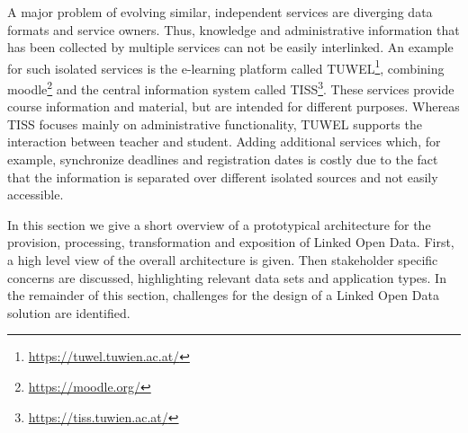\documentclass{article}
\begin{document}
A major problem of evolving similar, independent services are diverging data formats and service owners. Thus, knowledge and administrative information that has been collected by multiple services can not be easily interlinked. An example for such isolated services is the e-learning platform called TUWEL\footnote{\url{https://tuwel.tuwien.ac.at/}}, combining moodle\footnote{\url{https://moodle.org/}} and the central information system called TISS\footnote{\url{https://tiss.tuwien.ac.at/}}. These services provide course information and material, but are intended for different purposes. Whereas TISS focuses mainly on administrative functionality, TUWEL supports the interaction between teacher and student. 
Adding additional services which, for example, synchronize deadlines and registration dates is costly due to the fact that the information is separated over different isolated sources and not easily accessible. 

In this section we give a short overview of a prototypical architecture for the provision, processing, transformation and exposition of Linked Open Data. First, a high level view of the overall architecture is given. Then stakeholder specific concerns are discussed, highlighting relevant data sets and application types. In the remainder of this section, challenges for the design of a Linked Open Data solution are identified. 
\end{document}
